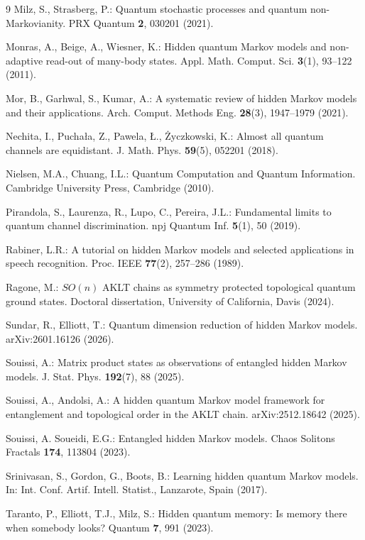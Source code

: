 \documentclass[11pt, reco]{article}
\begin{document}
\begin{thebibliography}{9}
Milz, S., Strasberg, P.:
Quantum stochastic processes and quantum non-Markovianity.
PRX Quantum \textbf{2}, 030201 (2021).

Monras, A., Beige, A., Wiesner, K.:
Hidden quantum Markov models and non-adaptive read-out of many-body states.
Appl. Math. Comput. Sci. \textbf{3}(1), 93–122 (2011).

Mor, B., Garhwal, S., Kumar, A.:
A systematic review of hidden Markov models and their applications.
Arch. Comput. Methods Eng. \textbf{28}(3), 1947–1979 (2021).

Nechita, I., Puchała, Z., Pawela, Ł., Życzkowski, K.:
Almost all quantum channels are equidistant.
J. Math. Phys. \textbf{59}(5), 052201 (2018).

Nielsen, M.A., Chuang, I.L.:
Quantum Computation and Quantum Information.
Cambridge University Press, Cambridge (2010).

Pirandola, S., Laurenza, R., Lupo, C., Pereira, J.L.:
Fundamental limits to quantum channel discrimination.
npj Quantum Inf. \textbf{5}(1), 50 (2019).

Rabiner, L.R.:
A tutorial on hidden Markov models and selected applications in speech recognition.
Proc. IEEE \textbf{77}(2), 257–286 (1989).

Ragone, M.:
\(SO(n)\) AKLT chains as symmetry protected topological quantum ground states.
Doctoral dissertation, University of California, Davis (2024).

Sundar, R., Elliott, T.:
Quantum dimension reduction of hidden Markov models.
arXiv:2601.16126 (2026).

Souissi, A.:
Matrix product states as observations of entangled hidden Markov models.
J. Stat. Phys. \textbf{192}(7), 88 (2025).

Souissi, A., Andolsi, A.:
A hidden quantum Markov model framework for entanglement and topological order in the AKLT chain.
arXiv:2512.18642 (2025).

 Souissi, A. Soueidi, E.G.:
Entangled hidden Markov models.
Chaos Solitons Fractals \textbf{174}, 113804 (2023).

Srinivasan, S., Gordon, G., Boots, B.:
Learning hidden quantum Markov models.
In: Int. Conf. Artif. Intell. Statist., Lanzarote, Spain (2017).

Taranto, P., Elliott, T.J., Milz, S.:
Hidden quantum memory: Is memory there when somebody looks?
Quantum \textbf{7}, 991 (2023).


\end{thebibliography}
\end{document}
